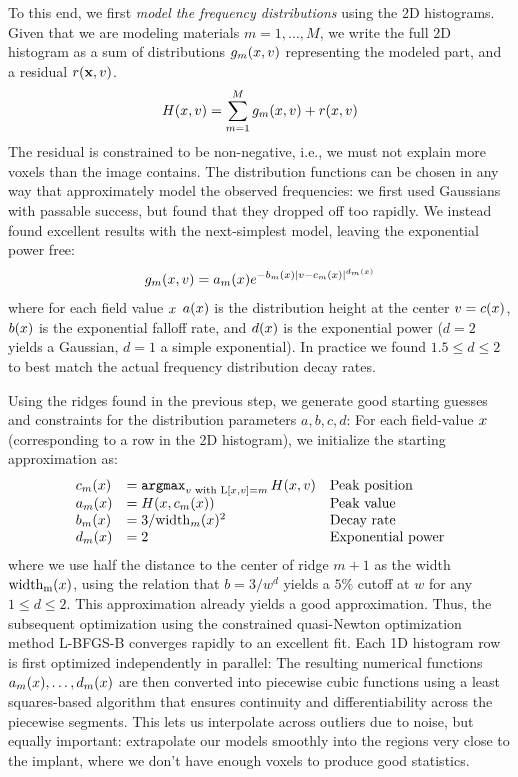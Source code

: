 \documentclass[pdflatex,sn-mathphys]{sn-jnl}%
\theoremstyle{thmstyleone}%
\theoremstyle{thmstyletwo}%
\theoremstyle{thmstylethree}%
\begin{document}
To this end, we first {\it model the frequency distributions} using the
2D histograms. Given that we are modeling materials $m=1,\ldots,M$,
we write the full 2D histogram as a sum of distributions
$g_m(x,v)$ representing the modeled part, and a
residual $r(\mathbf{x},v)$.
\begin{equation}
  \label{eq:hist}
  H(x,v) = \sum_{m=1}^M g_m(x,v) + r(x,v)
\end{equation}
The residual is constrained to be non-negative, i.e., we must not explain
more voxels than the image contains.
The distribution functions can be chosen in any way that approximately
model the observed frequencies: we first used Gaussians with passable success,
but found that they dropped off too rapidly. We instead found excellent results
with the next-simplest model, leaving the exponential power free:
\begin{equation}
  \label{eq:dist-form}
  g_m(x,v) = a_m(x) e^{-b_m(x) \vert v-c_m(x)\vert^{d_m(x)}}
\end{equation}
where for each field value $x$
$a(x)$ is the distribution height at the center $v=c(x)$,
$b(x)$ is the exponential falloff rate, and $d(x)$ is
the exponential power ($d=2$ yields a Gaussian, $d=1$ a simple exponential).
In practice we found $1.5\le d \le 2$ to best match the actual frequency
distribution decay rates.

Using the ridges found in the previous step, we generate good starting
guesses and constraints for the distribution parameters
$a,b,c,d$:
For each field-value $x$ (corresponding to a row in the 2D histogram),
we initialize the starting approximation as:
\begin{equation}
  \label{eq:starting-guesses}
  \begin{array}{lll}
    c_m(x) &= \mathop{\mathtt{argmax}}_{v \text{ with }\mathrm{L}[x,v] = m} H(x,v)  & \text{Peak position}  \\
    a_m(x) &= H(x,c_m(x)) & \text{Peak value}\\
    b_m(x) &= 3/\mathrm{width}_m(x)^2  & \text{Decay rate}\\
    d_m(x) &= 2 & \text{Exponential power}
  \end{array}
\end{equation}
where we use half the distance to the center of ridge $m+1$ as the width
$\mathrm{width_m}(x)$, using the relation that $b = 3/w^d$ yields
a $5\%$ cutoff at $w$ for any $1\le d \le 2$. This approximation
already yields a good approximation. Thus, the subsequent
optimization using the constrained quasi-Newton optimization method L-BFGS-B\cite{BFGS}
converges rapidly to an excellent fit. Each 1D histogram row is first optimized
independently in parallel: The resulting numerical functions
$a_m(x),\ldots,d_m(x)$ are then converted into piecewise cubic
functions using a least squares-based algorithm that ensures continuity
and differentiability across the piecewise segments. This lets us interpolate across
outliers due to noise, but equally important:
extrapolate our models smoothly into the regions very close to the implant, where
we don't have enough voxels to produce good statistics.
\end{document}
